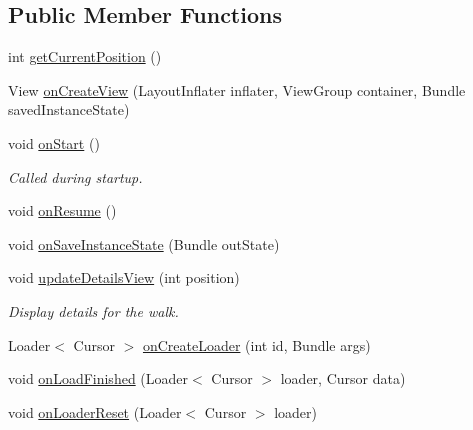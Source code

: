 \subsection*{Public Member Functions}
\begin{DoxyCompactItemize}
\item 
int \hyperlink{classuk_1_1ac_1_1swan_1_1digitaltrails_1_1fragments_1_1_walk_details_fragment_a4b0bda45a2c9b7735bb5b7fc62b369c8}{get\+Current\+Position} ()
\item 
View \hyperlink{classuk_1_1ac_1_1swan_1_1digitaltrails_1_1fragments_1_1_walk_details_fragment_ac86a35e57b85030a73a4a45aa0aabf12}{on\+Create\+View} (Layout\+Inflater inflater, View\+Group container, Bundle saved\+Instance\+State)
\item 
void \hyperlink{classuk_1_1ac_1_1swan_1_1digitaltrails_1_1fragments_1_1_walk_details_fragment_a1bcb57bacfc1e54b3e16dc4c69dc81a7}{on\+Start} ()
\begin{DoxyCompactList}\small\item\em Called during startup. \end{DoxyCompactList}\item 
void \hyperlink{classuk_1_1ac_1_1swan_1_1digitaltrails_1_1fragments_1_1_walk_details_fragment_aea2a80dc014964ba2086babb0a489ce1}{on\+Resume} ()
\item 
void \hyperlink{classuk_1_1ac_1_1swan_1_1digitaltrails_1_1fragments_1_1_walk_details_fragment_ac4ea27897f1f52d9ee9b2a649795cc0d}{on\+Save\+Instance\+State} (Bundle out\+State)
\item 
void \hyperlink{classuk_1_1ac_1_1swan_1_1digitaltrails_1_1fragments_1_1_walk_details_fragment_aa087d10188a545f579ce03e886bea006}{update\+Details\+View} (int position)
\begin{DoxyCompactList}\small\item\em Display details for the walk. \end{DoxyCompactList}\item 
Loader$<$ Cursor $>$ \hyperlink{classuk_1_1ac_1_1swan_1_1digitaltrails_1_1fragments_1_1_walk_details_fragment_a6d764b1d83b703e647ccb80efb5fd536}{on\+Create\+Loader} (int id, Bundle args)
\item 
void \hyperlink{classuk_1_1ac_1_1swan_1_1digitaltrails_1_1fragments_1_1_walk_details_fragment_a1e819f1b9cd824bf599dac6edb6ac313}{on\+Load\+Finished} (Loader$<$ Cursor $>$ loader, Cursor data)
\item 
void \hyperlink{classuk_1_1ac_1_1swan_1_1digitaltrails_1_1fragments_1_1_walk_details_fragment_a333139f954c2efde3e9d032ff855f30b}{on\+Loader\+Reset} (Loader$<$ Cursor $>$ loader)
\end{DoxyCompactItemize}
